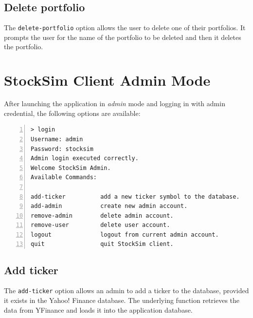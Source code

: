 \subsection{Delete portfolio}
The \texttt{delete-portfolio} option allows the user to delete one of their portfolios. It prompts the user for the name of the portfolio to be deleted and then it deletes the portfolio.

\section{StockSim Client Admin Mode}

After launching the application in \textit{admin} mode and logging in with admin credential, the following options are available:

\begin{lstlisting}[basicstyle=\footnotesize\ttfamily,language={},numbers=left,keepspaces=true,tabsize=4,
numberstyle=\footnotesize,numbersep=8pt,frame=single]
> login
Username: admin
Password: stocksim
Admin login executed correctly.
Welcome StockSim Admin.
Available Commands:

add-ticker			add a new ticker symbol to the database.
add-admin			create new admin account.                                                                                                                                                                     
remove-admin		delete admin account.                                                                                                                                                                         
remove-user			delete user account.                                                                                                                                                                          
logout				logout from current admin account.                                                                                                                                                            
quit				quit StockSim client.  
\end{lstlisting}

\subsection{Add ticker}
The \texttt{add-ticker} option allows an admin to add a ticker to the database, provided it exists in the Yahoo! Finance database.
The underlying function retrieves the data from YFinance and loads it into the application database.

